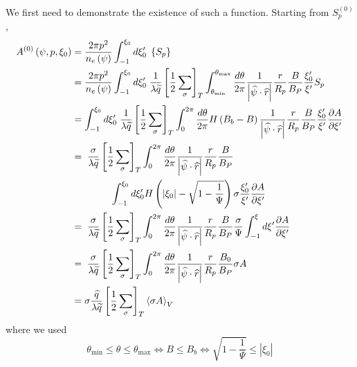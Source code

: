 We first need to demonstrate the existence of such a function. Starting from
$S_{p}^{\left( 0\right) }$,
\begin{align}
A^{\left( 0\right) }\left( \psi,p,\xi_{0}\right) & =\frac{2\pi p^{2}}{%
n_{e}\left( \psi\right) }\int_{-1}^{\xi_{0}}d\xi_{0}^{\prime}\;\left\{
S_{p}\right\}  \nonumber \\
& =\frac{2\pi p^{2}}{n_{e}\left( \psi\right) }\int_{-1}^{\xi_{0}}d\xi
_{0}^{\prime}\;\frac{1}{\lambda\widetilde{q}}\left[ \frac{1}{2}\sum_{\sigma
}\right] _{T}\int_{\theta_{\min}}^{\theta_{\max}}\frac{d\theta}{2\pi}\frac
{1}{\left| \widehat{\psi}\cdot\widehat{r}\right| }\frac{r}{R_{p}}\frac
{B}{B_{P}}\frac{\xi_{0}^{\prime}}{\xi^{\prime}}S_{p}  \nonumber \\
& =\int_{-1}^{\xi_{0}}d\xi_{0}^{\prime}\;\frac{1}{\lambda\widetilde{q}}
\left[ \frac{1}{2}\sum_{\sigma}\right] _{T}\int_{0}^{2\pi}\frac{d\theta }{
2\pi}H\left( B_{b}-B\right) \frac{1}{\left| \widehat{\psi}\cdot \widehat{r}
\right| }\frac{r}{R_{p}}\frac{B}{B_{P}}\frac{\xi_{0}^{\prime}}{\xi^{\prime}}%
\frac{\partial A}{\partial\xi^{\prime}}  \nonumber \\
& =\;\frac{\sigma}{\lambda\widetilde{q}}\left[ \frac{1}{2}\sum_{\sigma
}\right] _{T}\int_{0}^{2\pi}\frac{d\theta}{2\pi}\frac{1}{\left| \widehat{
\psi}\cdot\widehat{r}\right| }\frac{r}{R_{p}}\frac{B}{B_{P}}  \nonumber \\
& \qquad\qquad\int_{-1}^{\xi_{0}}d\xi_{0}^{\prime}H\left( \left| \xi
_{0}\right| -\sqrt{1-\frac{1}{\Psi}}\right) \sigma\frac{\xi_{0}^{\prime}}{
\xi^{\prime}}\frac{\partial A}{\partial\xi^{\prime}}  \nonumber \\
& =\;\frac{\sigma}{\lambda\widetilde{q}}\left[ \frac{1}{2}\sum_{\sigma
}\right] _{T}\int_{0}^{2\pi}\frac{d\theta}{2\pi}\frac{1}{\left| \widehat{\psi%
}\cdot\widehat{r}\right| }\frac{r}{R_{p}}\frac{B}{B_{P}}\frac{\sigma}{\Psi}
\int_{-1}^{\xi}d\xi^{\prime}\frac{\partial A}{\partial \xi^{\prime}}
\nonumber \\
& =\;\frac{\sigma}{\lambda\widetilde{q}}\left[ \frac{1}{2}\sum_{\sigma
}\right] _{T}\int_{0}^{2\pi}\frac{d\theta}{2\pi}\frac{1}{\left| \widehat{\psi%
}\cdot\widehat{r}\right| }\frac{r}{R_{p}}\frac{B_{0}}{B_{P}}\sigma A
\nonumber \\
& =\sigma\frac{\widehat{q}}{\lambda\widetilde{q}}\left[ \frac{1}{2}
\sum_{\sigma}\right] _{T}\left\langle \sigma A\right\rangle _{V}
\end{align}
where we used
\begin{equation}
\theta_{\min}\leq\theta\leq\theta_{\max}\Leftrightarrow B\leq
B_{b}\Leftrightarrow\sqrt{1-\frac{1}{\Psi}}\leq\left| \xi_{0}\right|
\end{equation}

